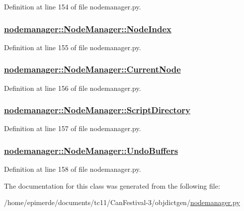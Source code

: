 Definition at line 154 of file nodemanager.py.\hypertarget{classnodemanager_1_1NodeManager_410b10ff94d011c0423028d7d57d0e4d}{
\subsubsection[NodeIndex]{\setlength{\rightskip}{0pt plus 5cm}\hyperlink{classnodemanager_1_1NodeManager_410b10ff94d011c0423028d7d57d0e4d}{nodemanager::Node\-Manager::Node\-Index}}}
\label{classnodemanager_1_1NodeManager_410b10ff94d011c0423028d7d57d0e4d}




Definition at line 155 of file nodemanager.py.\hypertarget{classnodemanager_1_1NodeManager_c63d9db3d9564ad4c110fddf4532c0ba}{
\subsubsection[CurrentNode]{\setlength{\rightskip}{0pt plus 5cm}\hyperlink{classnodemanager_1_1NodeManager_c63d9db3d9564ad4c110fddf4532c0ba}{nodemanager::Node\-Manager::Current\-Node}}}
\label{classnodemanager_1_1NodeManager_c63d9db3d9564ad4c110fddf4532c0ba}




Definition at line 156 of file nodemanager.py.\hypertarget{classnodemanager_1_1NodeManager_6c8bf71c030cd7647b28623e61c7df4a}{
\subsubsection[ScriptDirectory]{\setlength{\rightskip}{0pt plus 5cm}\hyperlink{classnodemanager_1_1NodeManager_6c8bf71c030cd7647b28623e61c7df4a}{nodemanager::Node\-Manager::Script\-Directory}}}
\label{classnodemanager_1_1NodeManager_6c8bf71c030cd7647b28623e61c7df4a}




Definition at line 157 of file nodemanager.py.\hypertarget{classnodemanager_1_1NodeManager_4e29c7a82ea6540edcbc55a1f98b77ae}{
\subsubsection[UndoBuffers]{\setlength{\rightskip}{0pt plus 5cm}\hyperlink{classnodemanager_1_1NodeManager_4e29c7a82ea6540edcbc55a1f98b77ae}{nodemanager::Node\-Manager::Undo\-Buffers}}}
\label{classnodemanager_1_1NodeManager_4e29c7a82ea6540edcbc55a1f98b77ae}




Definition at line 158 of file nodemanager.py.

The documentation for this class was generated from the following file:\begin{CompactItemize}
\item 
/home/epimerde/documents/tc11/Can\-Festival-3/objdictgen/\hyperlink{nodemanager_8py}{nodemanager.py}\end{CompactItemize}
